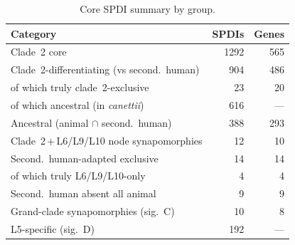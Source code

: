 \documentclass[11pt,a4paper]{article}
\begin{document}
\begin{table}[h!]
\centering
\caption{Core SPDI summary by group.}
\label{tab:core_summary}
\begin{tabular}{lrr}
\toprule
Category & SPDIs & Genes \\
\midrule
Clade~2 core               & 1292 & 565 \\
Clade~2-differentiating (vs second.\ human) & 904  & 486 \\
\quad of which truly clade~2-exclusive & 23 & 20 \\
\quad of which ancestral (in \textit{canettii}) & 616 & --- \\
Ancestral (animal $\cap$ second.\ human) & 388 & 293 \\
Clade~2\,+\,L6/L9/L10 node synapomorphies & 12 & 10 \\
Second.\ human-adapted exclusive & 14   & 14 \\
\quad of which truly L6/L9/L10-only & 4 & 4 \\
Second.\ human absent all animal & 9    & 9 \\
Grand-clade synapomorphies (sig.\ C) & 10 & 8 \\
L5-specific (sig.\ D)          & 192  & --- \\
\bottomrule
\end{tabular}
\end{table}
\end{document}
